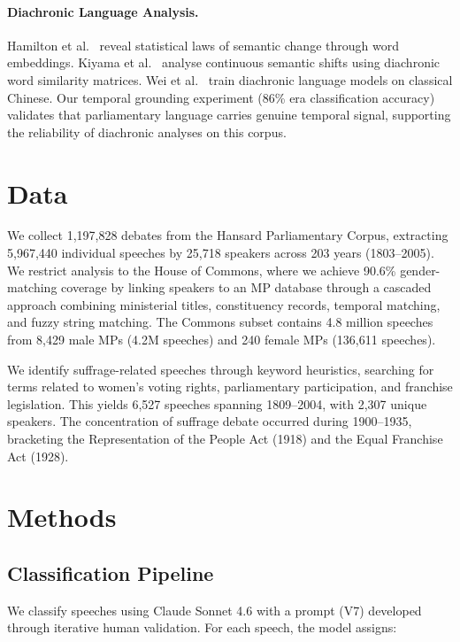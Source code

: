 \documentclass[11pt]{article}
\begin{document}
\paragraph{Diachronic Language Analysis.}
Hamilton et al.~\cite{hamilton2016} reveal statistical laws of semantic change through word embeddings.
Kiyama et al.~\cite{kiyama2025} analyse continuous semantic shifts using diachronic word similarity matrices.
Wei et al.~\cite{wei2025} train diachronic language models on classical Chinese.
Our temporal grounding experiment (86\% era classification accuracy) validates that parliamentary language carries genuine temporal signal, supporting the reliability of diachronic analyses on this corpus.

\section{Data}

We collect 1,197,828 debates from the Hansard Parliamentary Corpus, extracting 5,967,440 individual speeches by 25,718 speakers across 203 years (1803--2005).
We restrict analysis to the House of Commons, where we achieve 90.6\% gender-matching coverage by linking speakers to an MP database through a cascaded approach combining ministerial titles, constituency records, temporal matching, and fuzzy string matching.
The Commons subset contains 4.8 million speeches from 8,429 male MPs (4.2M speeches) and 240 female MPs (136,611 speeches).

We identify suffrage-related speeches through keyword heuristics, searching for terms related to women's voting rights, parliamentary participation, and franchise legislation.
This yields 6,527 speeches spanning 1809--2004, with 2,307 unique speakers.
The concentration of suffrage debate occurred during 1900--1935, bracketing the Representation of the People Act (1918) and the Equal Franchise Act (1928).

\section{Methods}

\subsection{Classification Pipeline}

We classify speeches using Claude Sonnet 4.6 with a prompt (V7) developed through iterative human validation.
For each speech, the model assigns:
\end{document}
